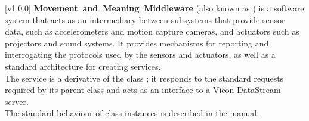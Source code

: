 [v1.0.0]
\textbf{Movement~and~Meaning~Middleware} (also known as \mplusm{}) is a software system
that acts as an intermediary between subsystems that provide sensor data, such as
accelerometers and motion capture cameras, and actuators such as projectors and sound
systems.
It provides mechanisms for reporting and interrogating the protocols used by the sensors
and actuators, as well as a standard architecture for creating services.\\

The \VDSI{} service is a derivative of the \mplusm{} class ;
it responds to the standard requests required by its parent class and acts as an interface
to a Vicon DataStream server.\\

The standard behaviour of  class instances is described in
the \emph{\MMM} manual.
\primaryEnd{}
